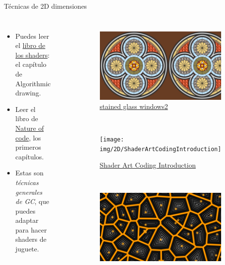 \begin{frame}{Técnicas de 2D dimensiones}
\begin{columns}
    \begin{itemize}
         \item Puedes leer el \href{https://thebookofshaders.com/05/}{libro de los shaders}: el capítulo de Algorithmic drawing.
         \item Leer el libro de \href{https://natureofcode.com/}{Nature of code}, los primeros capítulos.
         \item Estas son \emph{técnicas generales de GC}, que puedes adaptar para hacer shaders de juguete.
     \end{itemize}
\begin{figure}[htp]
 \centering
 \begin{subfigure}[b]{0.42\textwidth}
   \includegraphics[width=\textwidth]{img/2D/stainedGlassWindows2}
   \caption{\href{https://www.shadertoy.com/view/3cXSz4}{stained glass windows2}}
 \end{subfigure}
~
 \begin{subfigure}[b]{0.42\textwidth}
   \texttt{[image: img/2D/ShaderArtCodingIntroduction]}
   \caption{\href{https://www.shadertoy.com/view/mtyGWy}{Shader Art Coding Introduction}}
 \end{subfigure}
\\
 \begin{subfigure}[b]{0.42\textwidth}
   \includegraphics[width=\textwidth]{img/2D/VoronoiDistances}

\end{subfigure}
\end{figure}
\end{columns}
\end{frame}
